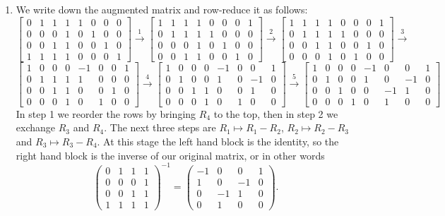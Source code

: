 \documentclass{amsart}
\newcommand{\xra}{\xrightarrow}
\renewcommand{\:}       {\colon}
\newcommand{\bbm}{\begin{pmatrix}}
\newcommand{\ebm}{\end{pmatrix}}
\begin{document}
\begin{enumerate}
 \item %
  We write down the augmented matrix and row-reduce it as follows:
  {\tiny \[ 
   \left[ \begin{array}{cccc|cccc}
    0&1&1&1 & 1&0&0&0 \\
    0&0&0&1 & 0&1&0&0 \\
    0&0&1&1 & 0&0&1&0 \\
    1&1&1&1 & 0&0&0&1 
   \end{array} \right] \xra{1}
   \left[ \begin{array}{cccc|cccc}
    1&1&1&1 & 0&0&0&1 \\
    0&1&1&1 & 1&0&0&0 \\
    0&0&0&1 & 0&1&0&0 \\
    0&0&1&1 & 0&0&1&0
   \end{array} \right] \xra{2}
   \left[ \begin{array}{cccc|cccc}
    1&1&1&1 & 0&0&0&1 \\
    0&1&1&1 & 1&0&0&0 \\
    0&0&1&1 & 0&0&1&0 \\
    0&0&0&1 & 0&1&0&0
   \end{array} \right] \xra{3}
  \] \[
   \left[ \begin{array}{cccc|cccc}
    1&0&0&0 & -1& 0& 0& 1 \\
    0&1&1&1 &  1& 0& 0& 0 \\
    0&0&1&1 &  0& 0& 1& 0 \\
    0&0&0&1 &  0& 1& 0& 0
   \end{array} \right] \xra{4}
   \left[ \begin{array}{cccc|cccc}
    1&0&0&0 & -1& 0& 0& 1 \\
    0&1&0&0 &  1& 0&-1& 0 \\
    0&0&1&1 &  0& 0& 1& 0 \\
    0&0&0&1 &  0& 1& 0& 0
   \end{array} \right] \xra{5}
   \left[ \begin{array}{cccc|cccc}
    1&0&0&0 & -1& 0& 0& 1 \\
    0&1&0&0 &  1& 0&-1& 0 \\
    0&0&1&0 &  0&-1& 1& 0 \\
    0&0&0&1 &  0& 1& 0& 0
   \end{array} \right]
  \]}
  In step 1 we reorder the rows by bringing $R_4$ to the top, then in
  step 2 we exchange $R_3$ and $R_4$.  The next three steps are
  $R_1\mapsto R_1-R_2$, $R_2\mapsto R_2-R_3$ and
  $R_3\mapsto R_3-R_4$.  At this stage the left hand block is the
  identity, so the right hand block is the inverse of our original
  matrix, or in other words 
  {\tiny \[
   \bbm
    0 & 1 & 1 & 1 \\
    0 & 0 & 0 & 1 \\
    0 & 0 & 1 & 1 \\
    1 & 1 & 1 & 1 
   \ebm^{-1} = 
   \bbm
    -1& 0& 0& 1 \\
     1& 0&-1& 0 \\
     0&-1& 1& 0 \\
     0& 1& 0& 0
   \ebm.
  \]}
\end{enumerate} 



\closegraphsfile
\end{document}
